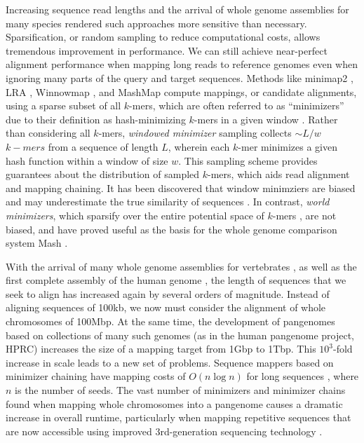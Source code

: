 \documentclass{bioinfo}
\theoremstyle{definition}
\begin{document}
Increasing sequence read lengths and the arrival of whole genome assemblies for many species rendered such approaches more sensitive than necessary.
Sparsification, or random sampling to reduce computational costs, allows tremendous improvement in performance.
We can still achieve near-perfect alignment performance when mapping long reads to reference genomes even when ignoring many parts of the query and target sequences.
Methods like minimap2 \citep{Li_2018}, LRA \citep{Ren_2021}, Winnowmap \citep{Jain_2020}, and MashMap \citep{Jain_2018} compute mappings, or candidate alignments, using a sparse subset of all $k$-mers, which are often referred to as ``minimizers'' due to their definition as hash-minimizing $k$-mers in a given window \cite{Roberts_2004}.
Rather than considering all $k$-mers, \textit{windowed minimizer} sampling collects $\sim L/w$ $k-mers$ from a sequence of length $L$, wherein each $k$-mer minimizes a given hash function within a window of size $w$.
This sampling scheme provides guarantees about the distribution of sampled $k$-mers, which aids read alignment and mapping chaining.
It has been discovered that window minimziers are biased and may underestimate the true similarity of sequences \citep{Belbasi_2022}.
In contrast, \textit{world minimizers}, which sparsify over the entire potential space of $k$-mers \citep{Broder_1997}, are not biased, and have proved useful as the basis for the whole genome comparison system Mash \citep{Ondov_2016}.

With the arrival of many whole genome assemblies for vertebrates \citep{Rhie_2021}, as well as the first complete assembly of the human genome \cite{Nurk_2022}, the length of sequences that we seek to align has increased again by several orders of magnitude.
Instead of aligning sequences of 100kb, we now must consider the alignment of whole chromosomes of 100Mbp.
At the same time, the development of pangenomes based on collections of many such genomes (as in the human pangenome project, HPRC) increases the size of a mapping target from 1Gbp to 1Tbp.
This $10^3$-fold increase in scale leads to a new set of problems. %
Sequence mappers based on minimizer chaining have mapping costs of $O(n \log n)$ for long sequences \citep{Jain_2022}, where $n$ is the number of seeds.
The vast number of minimizers and minimizer chains found when mapping whole chromosomes into a pangenome causes a dramatic increase in overall runtime, particularly when mapping repetitive sequences that are now accessible using improved 3rd-generation sequencing technology \citep{Logsdon_2021,Nurk_2022}.
\end{document}
